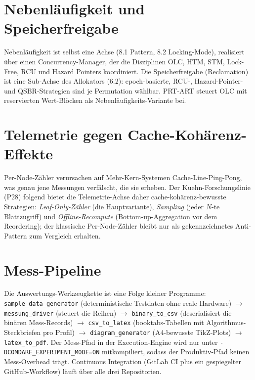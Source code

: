\section{Nebenläufigkeit und Speicherfreigabe}\label{sec:concurrency}

Nebenläufigkeit ist selbst eine Achse (8.1 Pattern, 8.2 Locking-Mode), realisiert über einen
Concurrency-Manager, der die Disziplinen OLC, HTM, STM, Lock-Free, RCU und Hazard Pointers
koordiniert. Die Speicherfreigabe (Reclamation) ist eine Sub-Achse des Allokators (6.2):
epoch-basierte, RCU-, Hazard-Pointer- und QSBR-Strategien sind je Permutation wählbar. PRT-ART
steuert OLC mit reservierten Wert-Blöcken als Nebenläufigkeits-Variante bei.

\section{Telemetrie gegen Cache-Kohärenz-Effekte}\label{sec:telemetry}

Per-Node-Zähler verursachen auf Mehr-Kern-Systemen Cache-Line-Ping-Pong, was genau jene
Messungen verfälscht, die sie erheben. Der Kuehn-Forschungslinie (P28) folgend bietet die
Telemetrie-Achse daher cache-kohärenz-bewusste Strategien: \emph{Leaf-Only-Zähler} (die
Hauptvariante), \emph{Sampling} (jeder $N$-te Blattzugriff) und \emph{Offline-Recompute}
(Bottom-up-Aggregation vor dem Reordering); der klassische Per-Node-Zähler bleibt nur als
gekennzeichnetes Anti-Pattern zum Vergleich erhalten.

\section{Mess-Pipeline}\label{sec:pipeline}

Die Auswertungs-Werkzeugkette ist eine Folge kleiner Programme:
\texttt{sample\_data\_generator} (deterministische Testdaten ohne reale Hardware) $\rightarrow$
\texttt{messung\_driver} (steuert die Reihen) $\rightarrow$ \texttt{binary\_to\_csv}
(deserialisiert die binären Mess-Records) $\rightarrow$ \texttt{csv\_to\_latex}
(booktabs-Tabellen mit Algorithmus-Steckbriefen pro Profil) $\rightarrow$
\texttt{diagram\_generator} (A4-bewusste TikZ-Plots) $\rightarrow$ \texttt{latex\_to\_pdf}.
Der Mess-Pfad in der Execution-Engine wird nur unter
\texttt{-DCOMDARE\_EXPERIMENT\_MODE=ON} mitkompiliert, sodass der Produktiv-Pfad keinen
Mess-Overhead trägt. Continuous Integration (GitLab CI plus ein gespiegelter
GitHub-Workflow) läuft über alle drei Repositorien.
